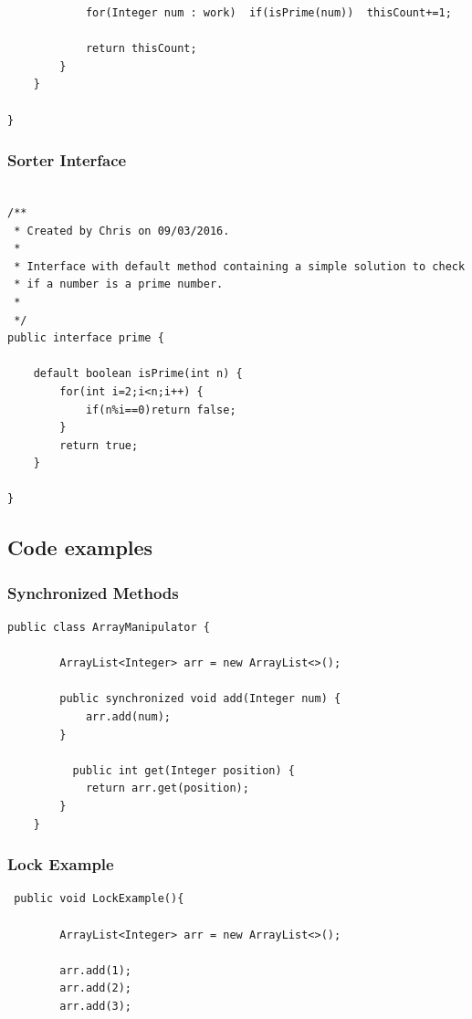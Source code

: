 \documentclass[10pt]{article}  %
\theoremstyle{definition}
\theoremstyle{remark}
\begin{document}
\begin{appendices}
\begin{lstlisting}
            for(Integer num : work)  if(isPrime(num))  thisCount+=1;

            return thisCount;
        }
    }

}
\end{lstlisting}

\newpage
\subsubsection{Sorter Interface}\label{1} 
  \begin{lstlisting}

/**
 * Created by Chris on 09/03/2016.
 *
 * Interface with default method containing a simple solution to check
 * if a number is a prime number.
 *
 */
public interface prime {

    default boolean isPrime(int n) {
        for(int i=2;i<n;i++) {
            if(n%i==0)return false;
        }
        return true;
    }

}

\end{lstlisting}

\newpage
\subsection{Code examples}
\subsubsection{Synchronized Methods}\label{refSync} 
\begin{lstlisting}
public class ArrayManipulator {

        ArrayList<Integer> arr = new ArrayList<>();

        public synchronized void add(Integer num) {
            arr.add(num);
        }

          public int get(Integer position) {
            return arr.get(position);
        }
    }
\end{lstlisting}

\subsubsection{Lock Example}\label{refLock} 
\begin{lstlisting}
 public void LockExample(){

        ArrayList<Integer> arr = new ArrayList<>();

        arr.add(1);
        arr.add(2);
        arr.add(3);


\end{lstlisting}
\end{appendices}
\end{document}
